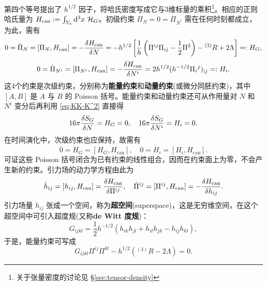 第四个等号提出了 $h^{1/2}$ 因子，将哈氏密度写成它与3维标量的乘积\footnote{关于张量密度的讨论见 \S\ref{sec:tensor-density}}。相应的正则哈氏量为 $H_{\mathrm{can}}:=\int_{\Sigma_t}\dd[3]{x}\,\mathcal{H}_G$。初级约束 $\Pi_{N}=0=\Pi_{N^{i}}$ 需在任何时刻都成立，为此，需有
\[ 0 = \dot{\Pi}_{N} = [\Pi_{N},H_{\mathrm{can}}] = -\fdv{H_{\mathrm{can}}}{N} = -h^{1/2}\left[\frac{1}{h}\left(\Pi^{ij}\Pi_{ij}-\frac{1}{2}\Pi^{2}\right)- {}^{(3)}R+2\Lambda\right] =: H_G, \]
\[ 0 = \dot{\Pi}_{N^{i}} = [\Pi_{N^{i}},H_{\mathrm{can}}] = -\fdv{H_{\mathrm{can}}}{N^{i}} = 2h^{1/2}(h^{-1/2}\Pi_i{}^j)_{|j} =: H_{i}. \]
这4个约束是次级约束，分别称为\textbf{能量约束}和\textbf{动量约束}(或微分同胚约束)，其中 $[A, B]$ 是 $A$ 与 $B$ 的 Poisson 括号。能量约束和动量约束还可从作用量对 $N$ 和 $N^{i}$ 变分后再利用 \eqref{eq:KK-K^2} 直接得
\[ 16\pi \fdv{S_G}{N} = H_G = 0, \quad 16\pi \fdv{S_G}{N^{i}} = H_{i} = 0. \]
在时间演化中，次级约束也应保持，故需有
\[ 0 = \dot{H}_G = [H_G,H_{\mathrm{can}}], \quad 0 = \dot{H}_{i} = [H_{i},H_{\mathrm{can}}]. \]
可证这些 Poisson 括号闭合为已有约束的线性组合，因而在约束面上为零，不会产生新的约束。引力场的动力学方程由此为
\[ \dot{h}_{ij} = [h_{ij},H_{\mathrm{can}}] = \fdv{H_{\mathrm{can}}}{\Pi^{ij}}, \quad \dot{\Pi}^{ij} = [\Pi^{ij},H_{\mathrm{can}}] = -\fdv{H_{\mathrm{can}}}{h_{ij}}. \]
引力场量 $h_{ij}$ 张成一个空间，称为\textbf{超空间}(superspace)，这是无穷维空间，在这个超空间中可引入超度规(又称\textbf{de Witt 度规})：
\[ G_{ijkl} = \frac{1}{2}h^{-1/2}(h_{ik}h_{jl}+h_{il}h_{jk}-h_{ij}h_{kl}), \]
于是，能量约束可写成
\[ G_{ijkl}\Pi^{ij}\Pi^{kl} - h^{1/2}(^{(3)}R-2\Lambda) = 0. \]

